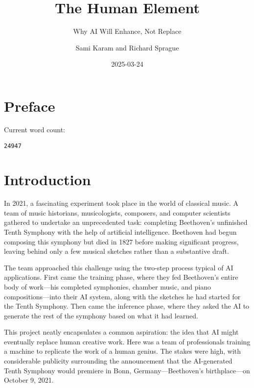 \documentclass[
  Letterpaper,
]{scrbook}
\title{The Human Element}
\subtitle{Why AI Will Enhance, Not Replace}
\author{Sami Karam and Richard Sprague}
\date{2025-03-24}
\renewcommand*\contentsname{Table of contents}
\newcommand\contentsname{Table of contents}
\begin{document}
\frontmatter
\maketitle

\renewcommand*\contentsname{Table of contents}
{
\setcounter{tocdepth}{2}
\tableofcontents
}

\mainmatter
{}

\chapter*{Preface}\label{preface}


Current word count:

\begin{verbatim}
24947
\end{verbatim}


\chapter*{Introduction}\label{introduction}


In 2021, a fascinating experiment took place in the world of classical
music. A team of music historians, musicologists, composers, and
computer scientists gathered to undertake an unprecedented task:
completing Beethoven's unfinished Tenth Symphony with the help of
artificial intelligence. Beethoven had begun composing this symphony but
died in 1827 before making significant progress, leaving behind only a
few musical sketches rather than a substantive draft.

The team approached this challenge using the two-step process typical of
AI applications. First came the training phase, where they fed
Beethoven's entire body of work---his completed symphonies, chamber
music, and piano compositions---into their AI system, along with the
sketches he had started for the Tenth Symphony. Then came the inference
phase, where they asked the AI to generate the rest of the symphony
based on what it had learned.

This project neatly encapsulates a common aspiration: the idea that AI
might eventually replace human creative work. Here was a team of
professionals training a machine to replicate the work of a human
genius. The stakes were high, with considerable publicity surrounding
the announcement that the AI-generated Tenth Symphony would premiere in
Bonn, Germany---Beethoven's birthplace---on October 9, 2021.
\end{document}
